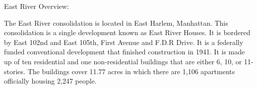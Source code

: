 East River Overview:

The East River consolidation is located in East Harlem, Manhattan. This consolidation is a single development known as East River Houses. It is bordered by East 102nd and East 105th, First Avenue and F.D.R Drive. It is a federally funded conventional development that finished construction in 1941. It is made up of ten residential and one non-residential buildings that are either 6, 10, or 11-stories. The buildings cover 11.77 acres in which there are 1,106 apartments officially housing 2,247 people. 